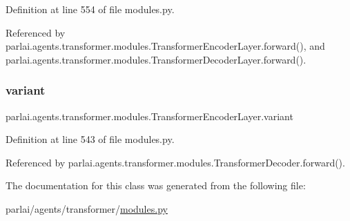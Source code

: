 Definition at line 554 of file modules.\+py.



Referenced by parlai.\+agents.\+transformer.\+modules.\+Transformer\+Encoder\+Layer.\+forward(), and parlai.\+agents.\+transformer.\+modules.\+Transformer\+Decoder\+Layer.\+forward().

\mbox{\label{classparlai_1_1agents_1_1transformer_1_1modules_1_1TransformerEncoderLayer_a33ff5864b155499ecf8d31383b33e8d8}} 
\subsubsection{\texorpdfstring{variant}{variant}}
{\footnotesize\ttfamily parlai.\+agents.\+transformer.\+modules.\+Transformer\+Encoder\+Layer.\+variant}



Definition at line 543 of file modules.\+py.



Referenced by parlai.\+agents.\+transformer.\+modules.\+Transformer\+Decoder.\+forward().



The documentation for this class was generated from the following file\+:\begin{DoxyCompactItemize}
\item 
parlai/agents/transformer/\hyperlink{parlai_2agents_2transformer_2modules_8py}{modules.\+py}\end{DoxyCompactItemize}
